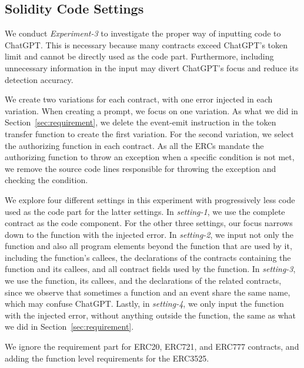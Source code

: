 \subsection{Solidity Code Settings}



We conduct \textit{Experiment-3} to investigate the proper way of inputting code
to ChatGPT. This is necessary because many contracts exceed ChatGPT’s token limit 
and cannot be directly used as the code part. Furthermore, including unnecessary information 
in the input may divert ChatGPT’s focus and reduce its detection accuracy. 

We create two variations for each contract, with one error injected in each variation.
When creating a prompt, we focus on one variation.  
As what we did in Section~\ref{sec:requirement}, we delete the event-emit 
instruction in the token transfer function to create the first variation.
For the second variation,  
we select the {\color{red}authorizing} function in each contract. 
As all the ERCs mandate the {\color{red}authorizing} function to 
throw an exception when a specific condition is not met, 
we remove the source code lines responsible for throwing the exception and 
checking the condition.  

We explore four different settings in this experiment with progressively 
less code used as the code part for the latter settings. 
In \textit{setting-1}, we use the complete contract as the code component. 
For the other three settings, our focus narrows down to the function with the injected error. 
In \textit{setting-2}, we input not only the function and also 
all program elements beyond the function
that are used by it, including the function’s callees, the declarations of the contracts 
containing the function and its callees, and all contract fields used by the function. 
In \textit{setting-3}, we use the function, its callees, and the declarations of the related contracts, 
since we observe that sometimes a function and an event
share the same name, which may confuse ChatGPT.
Lastly, in \textit{setting-4}, we only input the function with the injected error, without anything 
outside the function, the same as what we did in Section~\ref{sec:requirement}. 

We ignore the requirement part for ERC20, ERC721, and ERC777 contracts, and {\color{red} adding the function level requirements for the ERC3525}.

